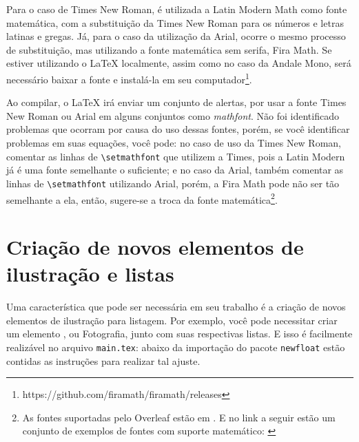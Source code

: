 Para o caso de Times New Roman, é utilizada a Latin Modern Math como fonte matemática, com a substituição da Times New Roman para os números e letras latinas e gregas. Já, para o caso da utilização da Arial, ocorre o mesmo processo de substituição, mas utilizando a fonte matemática sem serifa, Fira Math. Se estiver utilizando o \LaTeX{} localmente, assim como no caso da Andale Mono, será necessário baixar a fonte e instalá-la em seu computador\footnote{https://github.com/firamath/firamath/releases}.

Ao compilar, o \LaTeX{} irá enviar um conjunto de alertas, por usar a fonte Times New Roman ou Arial em alguns conjuntos como \textit{mathfont}. Não foi identificado problemas que ocorram por causa do uso dessas fontes, porém, se você identificar problemas em suas equações, você pode: no caso de uso da Times New Roman, comentar as linhas de \verb|\setmathfont| que utilizem a Times, pois a Latin Modern já é uma fonte semelhante o suficiente; e no caso da Arial, também comentar as linhas de \verb|\setmathfont| utilizando Arial, porém, a Fira Math pode não ser tão semelhante a ela, então, sugere-se a troca da fonte matemática\footnote{As fontes suportadas pelo Overleaf estão em \textcite{site:overleaf-fontes-2023}. E no link a seguir estão um conjunto de exemplos de fontes com suporte matemático: \textcite{site:tex-fontes-2022}}.

\section{Criação de novos elementos de ilustração e listas}\label{section:novos-elementos}
Uma característica que pode ser necessária em seu trabalho é a criação de novos elementos de ilustração para listagem. Por exemplo, você pode necessitar criar um elemento , ou Fotografia, junto com suas respectivas listas. E isso é facilmente realizável no arquivo \texttt{main.tex}: abaixo da importação do pacote \texttt{newfloat} estão contidas as instruções para realizar tal ajuste.

